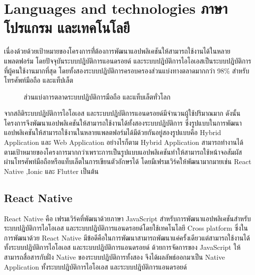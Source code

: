 \documentclass[12pt,oneside,openright,a4paper]{cpe-thai-project}
\begin{document}
\section{Languages and technologies ภาษาโปรแกรม และเทคโนโลยี}
เนื่องด้วยด้วยเป้าหมายของโครงการที่่ต้องการพัฒนาแอปพลิเคชันให้สามารถใช้งานได้ในหลายแพลตฟอร์ม 
โดยปัจจุบันระบบปฎิบัติการแอนดรอยด์ และระบบปฎิบัติการไอโอเอสเป็นระบบปฎิบัติการที่ผู้คนใช้งานมากที่สุด 
โดยทั้งสองระบบปฎิบัติการครอบครองส่วนแบ่งทางตลาดมากกว่า 98\%  สำหรับโทรศัพท์มือถือ และแท็ปเล็ต
\begin{figure}[H]\centering
  \setlength{\fboxrule}{0.2mm} %
  \setlength{\fboxsep}{1cm}
  \caption{ส่วนแบ่งการตลาดระบบปฏิบัติการมือถือ และแท็บเล็ตทั่วโลก}\label{fig:market}
\end{figure}
จากสถิติระบบปฎิบัติการไอโอเอส และระบบปฎิบัติการแอนดรอยด์มีจำนวนผู้ใช้ปริมาณมาก ดังนั้นโครงการจึงพัฒนาแอปพลิเคชันให้สามารถใช้งานได้ทั้งสองระบบปฎิบัติการ 
ซึ่งรูปแบบในการพัฒนาแอปพลิเคชันให้สามารถใช้งานในหลายแพลตฟอร์มได้มีด้วยกันอยู่สองรูปแบบคือ Hybrid Application และ Web Application อย่างไรก็ตาม Hybrid Application 
สามารถทำงานได้ตามเป้าหมายของโครงการมากกว่าเพราะการเป็นรูปแบบแอปพลิเคชันทำให้สามารถใช้หน้าจอสัมผัสผ่านโทรศัพท์มือถือหรือแท็บเล็ตในการเขียนตัวอักษรได้ โดยมีเฟรมเวิร์คให้พัฒนามากมายเช่น React Native ,Ionic และ Flutter เป็นต้น


\subsection{React Native}
React Native คือ เฟรมเวิร์คที่พัฒนาด้วยภาษา JavaScript สำหรับการพัฒนาแอปพลิเคชันสำหรับระบบปฎิบัติการไอโอเอส และระบบปฎิบัติการแอนดรอยด์โดยใช้เทคโนโลยี 
Cross platform ซึ่งในการพัฒนาด้วย React Native มีข้อดีคือในการพัฒนาสามารถพัฒนาแค่ครั้งเดียวแต่สามารถใช้งานได้ทั้งระบบปฎิบัติการไอโอเอส และระบบปฎิบัติการแอนดรอยด์ 
ด้วยการจัดการของ JavaScript ให้สามารถสื่อสารกับฝั่ง Native ของระบบปฎิบัติการทั้งสอง จึงได้ผลลัพธ์ออกมาเป็น Native Application ทั้งระบบปฎิบัติการไอโอเอส และระบบปฎิบัติการแอนดรอยด์ 
\end{document}
